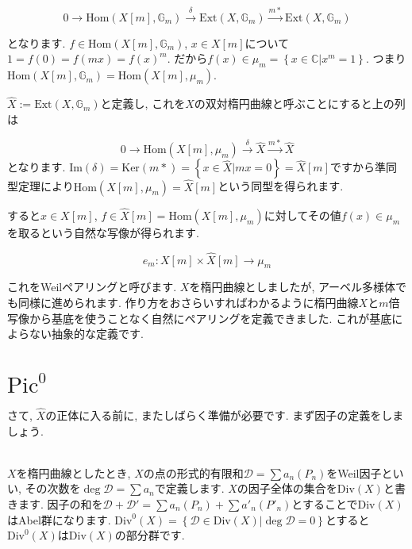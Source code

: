 \documentclass{jsarticle}
\def\Im{\mathrm{Im}}
\def\Ker{\mathrm{Ker}}
\def\Hom{\mathrm{Hom}}
\def\Ext{\mathrm{Ext}}
\def\Pic{\mathrm{Pic}}
\def\Div{\mathrm{Div}}
\theoremstyle{definition}
\numberwithin{theorem}{section}
\begin{document}
\begin{equation*}
0 \rightarrow \Hom(X[m], \mathbb{G}_m) \xrightarrow{\delta} \Ext(X, \mathbb{G}_m) \xrightarrow{m*} \Ext(X, \mathbb{G}_m)
\end{equation*}

となります. $f \in \Hom(X[m], \mathbb{G}_m)$, $x \in X[m]$について$1 = f(0) = f(mx) = f(x)^m$. だから$f(x) \in \mu_m = \left\{x \in \mathbb{C} | x^m = 1\right\}$. つまり$\Hom(X[m], \mathbb{G}_m) = \Hom(X[m], \mu_m)$.

$\hat{X} := \Ext(X, \mathbb{G}_m)$と定義し, これを$X$の双対楕円曲線と呼ぶことにすると上の列は

\begin{equation*}
0 \rightarrow \Hom(X[m], \mu_m) \xrightarrow{\delta} \hat{X} \xrightarrow{m*} \hat{X}
\end{equation*}
となります. $\Im(\delta) = \Ker(m*) = \left\{x \in \hat{X} | mx = 0\right\} = \hat{X}[m]$ですから準同型定理により$\Hom(X[m], \mu_m) = \hat{X}[m]$という同型を得られます.

すると$x \in X[m]$, $f \in \hat{X}[m] = \Hom(X[m], \mu_m)$に対してその値$f(x) \in \mu_m$を取るという自然な写像が得られます. 

\begin{equation*}
e_m: X[m] \times \hat{X}[m] \rightarrow \mu_m
\end{equation*}

これをWeilペアリングと呼びます. $X$を楕円曲線としましたが, アーベル多様体でも同様に進められます. 作り方をおさらいすればわかるように楕円曲線$X$と$m$倍写像から基底を使うことなく自然にペアリングを定義できました. これが基底によらない抽象的な定義です. 

\section{$\Pic^0$}
さて, $\hat{X}$の正体に入る前に, またしばらく準備が必要です. まず因子の定義をしましょう.

\hrulefill\\

$X$を楕円曲線としたとき, $X$の点の形式的有限和$\mathcal{D} = \sum a_n(P_n)$をWeil因子といい, その次数を$\deg \mathcal{D} = \sum a_n$で定義します. $X$の因子全体の集合を$\Div(X)$と書きます. 因子の和を$\mathcal{D} + \mathcal{D}' = \sum a_n(P_n) + \sum a'_n (P'_n)$とすることで$\Div(X)$はAbel群になります. $\Div^0(X) = \left\{\mathcal{D} \in \Div(X) | \deg \mathcal{D} = 0\right\}$とすると$\Div^0(X)$は$\Div(X)$の部分群です. 
\end{document}
